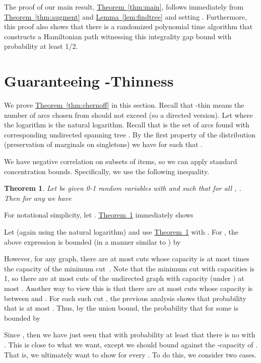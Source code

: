 \documentclass[11pt]{article}
\newcommand{\lref}[2][]{\hyperref[#2]{#1~\ref*{#2}}}
\newtheorem{theorem}{Theorem}[section]
\theoremstyle{definition}
\begin{document}
The proof of our main result, \lref[Theorem]{thm:main}, follows immediately from
\lref[Theorem]{thm:augment} and \lref[Lemma]{lem:findtree} and setting .
Furthermore, this proof also shows that there is a randomized polynomial time algorithm
that constructs a Hamiltonian  path witnessing this integrality gap bound with probability at least 1/2.



\section{Guaranteeing -Thinness}
\label{sec:chernoff}
We prove \lref[Theorem]{thm:chernoff} in this section.  Recall that
-thin means the number of arcs chosen from 
should not exceed  (so a directed version).
Let  where the logarithm is the natural logarithm. Recall
that  is the set of arcs found with corresponding undirected
spanning tree .  By the first property of the distribution
(preservation of marginals on singletons) we have for each  that .

We have negative correlation on subsets of items, so we can apply standard concentration bounds.
Specifically, we use the following inequality.
\begin{theorem}{\cite[Theorem 3.4]{PS97}}\label{thm:ps}
Let  be given 0-1 random variables with  and  such that for all ,
. Then for any  we have

\end{theorem}

For notational simplicity, let .
\lref[Theorem]{thm:ps} immediately shows

Let  (again using the natural logarithm) and use \lref[Theorem]{thm:ps} with .
For , the above expression is bounded (in a manner similar to \cite{AGMSS}) by

However, for any graph, there are at most  cuts whose capacity
is at most  times the capacity of the minimum
cut~\cite{KS96}. Note that the minimum cut with capacities  is 1, so
there are at most  cuts of the undirected graph  with capacity (under ) at most .
Another way to view this is that there are at most  cuts whose capacity is between  and .
For each such cut , the previous analysis shows that
probability that  is at most .
Thus, by the union bound, the probability that 
for some  is bounded by


Since , then we have just seen that with probability at least  that there is no 
with . This is close to what we want, except we should bound  against the -capacity of .
That is, we ultimately want to show  for every . To do this, we consider two cases.
\end{document}

